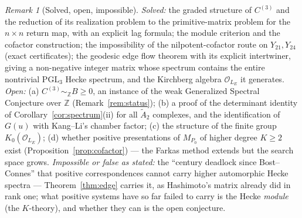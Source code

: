 \documentclass[11pt]{amsart}
\numberwithin{equation}{section}
\theoremstyle{definition}
\theoremstyle{remark}
\newtheorem{remark}[theorem]{Remark}
\newcommand{\Z}{\mathbb{Z}}
\newcommand{\cO}{\mathcal{O}}
\newcommand{\PGL}{\mathrm{PGL}}
\newcommand{\Atwo}{\widetilde A_2}
\newcommand{\Cthree}{C^{(3)}}
\newcommand{\LE}{L_{E}}
\newcommand{\SE}{\sim_{\Z}}
\begin{document}
\begin{remark}[Solved, open, impossible]\label{rem:scope}
\emph{Solved:} the graded structure of $\Cthree$ and the reduction of its realization
problem to the primitive-matrix problem for the $n\times n$ return map, with an explicit lag
formula; the module criterion and the cofactor construction; the impossibility of the
nilpotent-cofactor route on $Y_{21},Y_{24}$ (exact certificates); the geodesic edge flow
theorem with its explicit intertwiner, giving a non-negative integer matrix whose spectrum
contains the entire nontrivial $\PGL_3$ Hecke spectrum, and the Kirchberg algebra
$\cO_{\LE}$ it generates. \emph{Open:} (a) $\Cthree\SE B\ge0$, an instance of the weak
Generalized Spectral Conjecture over $\Z$ (Remark~\ref{rem:status}); (b) a proof of the
determinant identity of Corollary~\ref{cor:spectrum}(ii) for all $\Atwo$ complexes, and the
identification of $G(u)$ with Kang--Li's chamber factor; (c) the structure of the finite
group $K_0(\cO_{\LE})$; (d) whether positive presentations of $M_{P_0}$ of higher degree
$K\ge2$ exist (Proposition~\ref{prop:cofactor}) --- the Farkas method extends but the
search space grows. \emph{Impossible or false as stated:} the ``century deadlock since
Bost--Connes'' that positive correspondences cannot carry higher automorphic Hecke spectra
--- Theorem~\ref{thm:edge} carries it, as Hashimoto's matrix already did in rank one; what
positive systems have so far failed to carry is the Hecke \emph{module} (the $K$-theory),
and whether they can is the open conjecture.
\end{remark}
\end{document}
